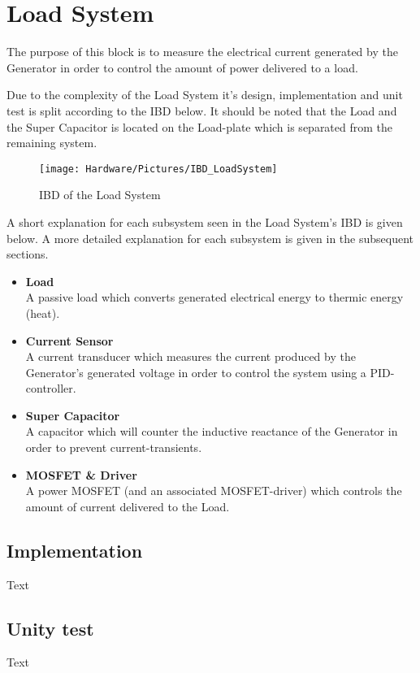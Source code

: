 \newpage
\section{Load System}
The purpose of this block is to measure the electrical current generated by the Generator in order to control the amount of power delivered to a load.

Due to the complexity of the Load System it's design, implementation and unit test is split according to the IBD below. It should be noted that the Load and the Super Capacitor is located on the Load-plate which is separated from the remaining system.

\begin{figure}[H]
	\centering
	\texttt{[image: Hardware/Pictures/IBD\_LoadSystem]}
	\caption{IBD of the Load System}
	\label{fig:IBD_Load_System}
\end{figure}

A short explanation for each subsystem seen in the Load System's IBD is given below. A more detailed explanation for each subsystem is given in the subsequent sections.
\begin{itemize}
	\item \textbf{Load}\\
	A passive load which converts generated electrical energy to thermic energy (heat).
	\item \textbf{Current Sensor}\\
	A current transducer which measures the current produced by the Generator's generated voltage in order to control the system using a PID-controller.
	\item \textbf{Super Capacitor}\\
	A capacitor which will counter the inductive reactance of the Generator in order to prevent current-transients.
	\item \textbf{MOSFET \& Driver}\\
	A power MOSFET (and an associated MOSFET-driver) which controls the amount of current delivered to the Load.
\end{itemize}
\newpage








\subsection{Implementation}
Text

\subsection{Unity test}
Text